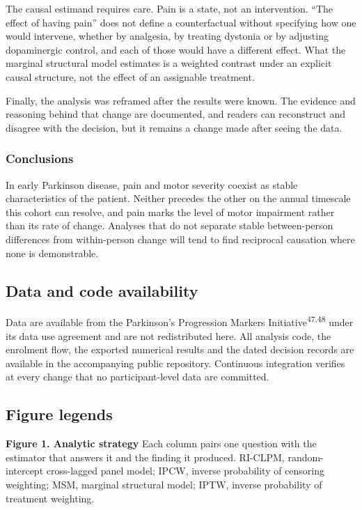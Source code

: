 \documentclass[
  english,
  12pt,
]{article}
\begin{document}
The causal estimand requires care. Pain is a state, not an intervention. ``The effect of having pain'' does not define a counterfactual without specifying how one would intervene, whether by analgesia, by treating dystonia or by adjusting dopaminergic control, and each of those would have a different effect. What the marginal structural model estimates is a weighted contrast under an explicit causal structure, not the effect of an assignable treatment.

Finally, the analysis was reframed after the results were known. The evidence and reasoning behind that change are documented, and readers can reconstruct and disagree with the decision, but it remains a change made after seeing the data.

\subsubsection{Conclusions}\label{conclusions}

In early Parkinson disease, pain and motor severity coexist as stable characteristics of the patient. Neither precedes the other on the annual timescale this cohort can resolve, and pain marks the level of motor impairment rather than its rate of change. Analyses that do not separate stable between-person differences from within-person change will tend to find reciprocal causation where none is demonstrable.

\subsection{Data and code availability}\label{data-and-code-availability}

Data are available from the Parkinson's Progression Markers Initiative\textsuperscript{47,48} under its data use agreement and are not redistributed here. All analysis code, the enrolment flow, the exported numerical results and the dated decision records are available in the accompanying public repository. Continuous integration verifies at every change that no participant-level data are committed.

\subsection{Figure legends}\label{figure-legends}

\textbf{Figure 1. Analytic strategy} Each column pairs one question with the estimator that answers it and the finding it produced. RI-CLPM, random-intercept cross-lagged panel model; IPCW, inverse probability of censoring weighting; MSM, marginal structural model; IPTW, inverse probability of treatment weighting.
\end{document}
